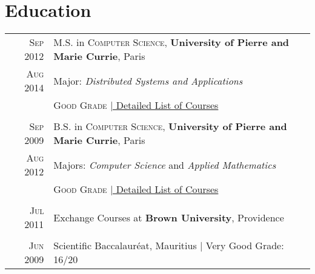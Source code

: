 \documentclass[a4paper,10pt]{article} %
\begin{document}

\section{Education}

\begin{tabular}{rl}


\textsc{Sep 2012} & M.S. in \textsc{Computer Science}, \textbf{University of Pierre and Marie Currie}, Paris\\
\textsc{Aug 2014} & Major: \emph{Distributed Systems and Applications}\\
                  & \normalsize \textsc{Good Grade} \hyperlink{grds_ms}{\hfill | \footnotesize Detailed List of Courses}\\
&\\


\textsc{Sep 2009} & B.S. in \textsc{Computer Science}, \textbf{University of Pierre and Marie Currie}, Paris \\
\textsc{Aug 2012} & Majors: \emph{Computer Science} and \emph{Applied Mathematics}\\
				  & \normalsize \textsc{Good Grade} \hyperlink{grds_bs}{\hfill| \footnotesize Detailed List of Courses}\\
&\\


\textsc{Jul 2011} & Exchange Courses at \textbf{Brown University}, Providence\\
&\\


\textsc{Jun 2009} & Scientific Baccalaur\'eat, Mauritius | Very Good Grade: 16/20


\end{tabular}

\end{document}
